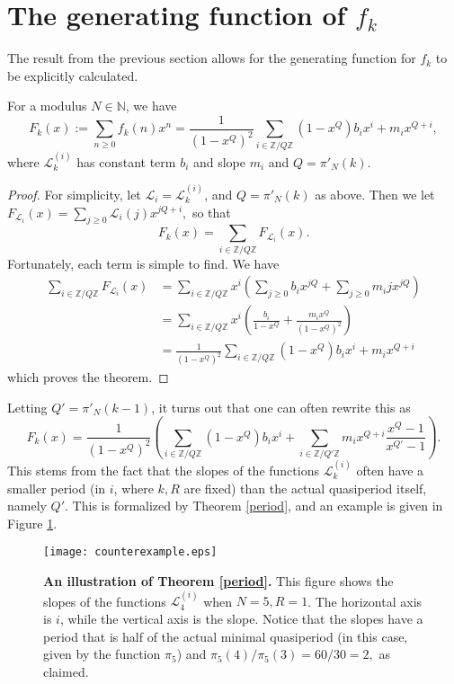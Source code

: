 \documentclass[12pt]{article}
\newcommand{\Z}{\mathbb{Z}}
\newcommand{\N}{\mathbb{N}}
\newcommand{\eqdef}{:=}
\begin{document}
\section[The generating function]{The generating function of $f_{k}$}

The result from the previous section allows for the generating function for $f_{k}$ to be explicitly calculated.

\begin{theorem}
For a modulus $N \in \N$, we have
\[F_{k}(x) \eqdef \sum_{n\ge 0}{f_{k}(n)x^n} = \frac{1}{(1-x^{Q})^2}\sum_{i \in \Z/Q\Z}{(1-x^{Q})b_ix^i+m_ix^{Q+i}},\]
where $\mathcal{L}_{k}^{(i)}$ has constant term $b_i$ and slope $m_i$ and $Q=\pi'_N(k)$.
\label{41}
\end{theorem}
\begin{proof}
For simplicity, let $\mathcal{L}_i =\mathcal{L}_{k}^{(i)}$, and $Q=\pi'_N(k)$ as above. Then we let $F_{\mathcal{L}_i}(x) = \sum_{j\ge 0}{\mathcal{L}_i(j)x^{jQ + i}},$ so that
\[F_{k}(x) = \sum_{i\in \Z/Q\Z}{F_{\mathcal{L}_i}(x)}.\]
Fortunately, each term is simple to find. We have
\begin{align*}
\sum_{i\in \Z/Q\Z}{F_{\mathcal{L}_i}(x)} &= \sum_{i\in \Z/Q\Z}{x^i \left(\sum_{j\ge 0}{b_ix^{jQ}}+\sum_{j\ge 0}{m_i j x^{jQ}} \right)}\\
&= \sum_{i\in \Z/Q\Z}{x^i \left(\frac{b_i}{1-x^{Q}} + \frac{m_ix^{Q}}{(1-x^{Q})^2}\right)} \\ &=\frac{1}{(1-x^Q)^2}\sum_{i\in \Z/Q\Z}{(1-x^{Q})b_ix^i+m_ix^{Q+i}}
\end{align*}
which proves the theorem.

\end{proof}

Letting $Q'=\pi'_N(k-1)$, it turns out that one can often rewrite this as 
\[F_{k}(x)=\frac{1}{(1-x^{Q})^2}\left(\sum_{i\in \Z/Q\Z}{(1-x^{Q})b_ix^i+\sum_{i\in \Z/Q'\Z}{m_ix^{Q+i}\frac{x^{Q}-1}{x^{Q'}-1}}}\right).\]
This stems from the fact that the slopes of the functions $\mathcal{L}_{k}^{(i)}$ often have a smaller period (in $i$, where $k,R$ are fixed) than the actual quasiperiod itself, namely $Q'$. This is formalized by Theorem \ref{period}, and an example is given in Figure \ref{illustration}.

\begin{figure}[!ht]
\begin{center}
\texttt{[image: counterexample.eps]}
\end{center}
\caption{\textbf{An illustration of Theorem \ref{period}.} This figure shows the slopes of the functions $\mathcal{L}_{4}^{(i)}$ when $N=5, R=1$. The horizontal axis is $i$, while the vertical axis is the slope. Notice that the slopes have a period that is half of the actual minimal quasiperiod (in this case, given by the function $\pi_5$) and $\pi_5(4)/\pi_5(3)=60/30=2,$ as claimed.}
\label{illustration}
\end{figure}
\end{document}
